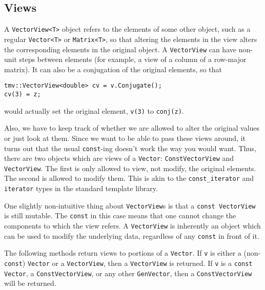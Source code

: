 \documentclass[twoside,letterpaper,11pt]{article}
\renewcommand{\tt}[1]{{\texttt {#1}}}
\begin{document}
\subsection{Views}
\label{VViews}

A \tt{VectorView<T>} object refers to the elements of some other object, such as a regular
\tt{Vector<T>} or \tt{Matrix<T>},
so that altering the elements in the view alters the
corresponding elements in the original object.  A \tt{VectorView}
can have non-unit
steps between elements (for example, a view of a column of a row-major
matrix).  It can also be a conjugation of the original
elements, so that
\begin{verbatim}
tmv::VectorView<double> cv = v.Conjugate();
cv(3) = z;
\end{verbatim}
would actually set the original element, \tt{v(3)} to \tt{conj(z)}. 

Also, we have to 
keep track of whether we are allowed to alter the original values or
just look at them.  
Since we want to be able to pass these views around, it turns out that
the usual \tt{const}-ing doesn't work the way you would want.
Thus, there are two objects which are views of a
\tt{Vector}:
\tt{ConstVectorView} and \tt{VectorView}.  
The first is only allowed to view,
not modify, the original elements.  The second is allowed to modify them.
This is akin to the \tt{const\_iterator} and \tt{iterator} types in the
standard template library.

One slightly non-intuitive thing about \tt{VectorView}s is that a 
\tt{const VectorView} is still mutable.  The \tt{const} in this case
means that one cannot change the components to which the view refers.
A \tt{VectorView} is inherently an object which can be used to 
modify the underlying data, regardless of any \tt{const} in front of it.

The following methods return views to portions of a \tt{Vector}.
If \tt{v} is either a (non-\tt{const}) \tt{Vector}
or a \tt{VectorView}, then a \tt{VectorView} is returned.
If \tt{v} is a \tt{const Vector}, a \tt{ConstVectorView}, or any other \tt{GenVector},
then a \tt{ConstVectorView} will be returned.  
\end{document}
